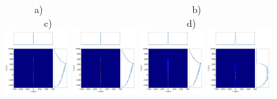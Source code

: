 \documentclass{iucr}              %
\begin{document}
\begin{figure}[h]
\flushleft
~~~~~~a)~~~~~~~~~~~~~~~~~~~~~~~~~~~~~~~b)~~~~~~~~~~~~~~~~~~~~~~~~~~~c)~~~~~~~~~~~~~~~~~~~~~~~~~~~~d)\\
\centering
\includegraphics[width=0.22\textwidth]{figures/p2s_V.png}
\includegraphics[width=0.22\textwidth]{figures/p2s_K.png}
\includegraphics[width=0.22\textwidth]{figures/p2s_parabolic-cone.png}
\includegraphics[width=0.22\textwidth]{figures/p2s_toroid.png}


\end{figure}
\end{document}
